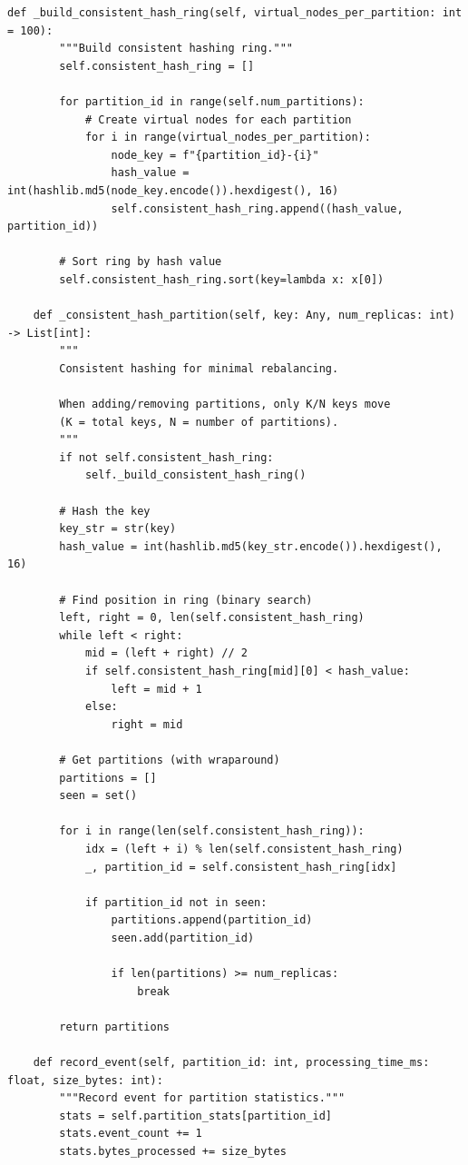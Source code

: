 \begin{lstlisting}[style=python, caption={Data Partitioning Strategies}]
    def _build_consistent_hash_ring(self, virtual_nodes_per_partition: int = 100):
        """Build consistent hashing ring."""
        self.consistent_hash_ring = []

        for partition_id in range(self.num_partitions):
            # Create virtual nodes for each partition
            for i in range(virtual_nodes_per_partition):
                node_key = f"{partition_id}-{i}"
                hash_value = int(hashlib.md5(node_key.encode()).hexdigest(), 16)
                self.consistent_hash_ring.append((hash_value, partition_id))

        # Sort ring by hash value
        self.consistent_hash_ring.sort(key=lambda x: x[0])

    def _consistent_hash_partition(self, key: Any, num_replicas: int) -> List[int]:
        """
        Consistent hashing for minimal rebalancing.

        When adding/removing partitions, only K/N keys move
        (K = total keys, N = number of partitions).
        """
        if not self.consistent_hash_ring:
            self._build_consistent_hash_ring()

        # Hash the key
        key_str = str(key)
        hash_value = int(hashlib.md5(key_str.encode()).hexdigest(), 16)

        # Find position in ring (binary search)
        left, right = 0, len(self.consistent_hash_ring)
        while left < right:
            mid = (left + right) // 2
            if self.consistent_hash_ring[mid][0] < hash_value:
                left = mid + 1
            else:
                right = mid

        # Get partitions (with wraparound)
        partitions = []
        seen = set()

        for i in range(len(self.consistent_hash_ring)):
            idx = (left + i) % len(self.consistent_hash_ring)
            _, partition_id = self.consistent_hash_ring[idx]

            if partition_id not in seen:
                partitions.append(partition_id)
                seen.add(partition_id)

                if len(partitions) >= num_replicas:
                    break

        return partitions

    def record_event(self, partition_id: int, processing_time_ms: float, size_bytes: int):
        """Record event for partition statistics."""
        stats = self.partition_stats[partition_id]
        stats.event_count += 1
        stats.bytes_processed += size_bytes


\end{lstlisting}
